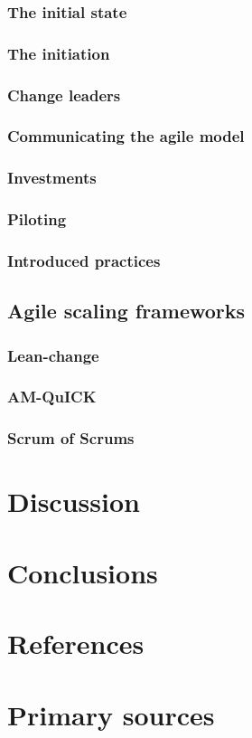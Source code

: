\documentclass{article}
\begin{document}
\subsubsection{The initial state}

\subsubsection{The initiation}

\subsubsection{Change leaders}

\subsubsection{Communicating the agile model}

\subsubsection{Investments}

\subsubsection{Piloting}

\subsubsection{Introduced practices}

\subsection{Agile scaling frameworks}

\subsubsection{Lean-change}

\subsubsection{AM-QuICK}

\subsubsection{Scrum of Scrums}



\section{Discussion}

\section{Conclusions}


\section{References}

\section{Primary sources}

\end{document}
